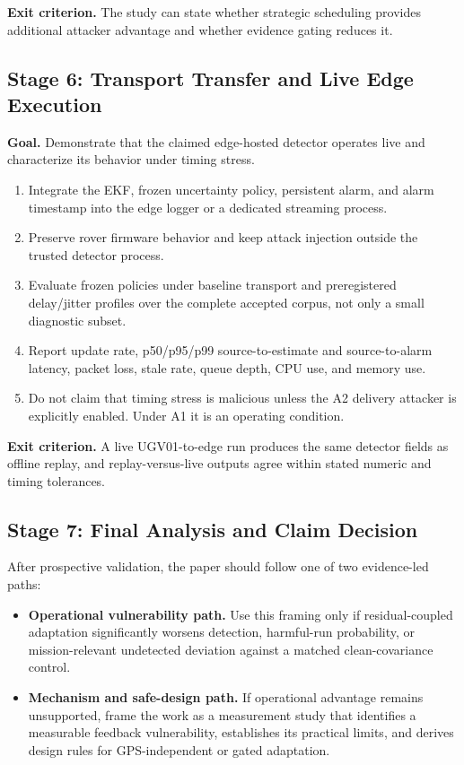 \documentclass[11pt,a4paper]{article}
\begin{document}
\textbf{Exit criterion.} The study can state whether strategic scheduling
provides additional attacker advantage and whether evidence gating reduces it.

\subsection{Stage 6: Transport Transfer and Live Edge Execution}

\textbf{Goal.} Demonstrate that the claimed edge-hosted detector operates live
and characterize its behavior under timing stress.

\begin{enumerate}
    \item Integrate the EKF, frozen uncertainty policy, persistent alarm, and
    alarm timestamp into the edge logger or a dedicated streaming process.

    \item Preserve rover firmware behavior and keep attack injection outside
    the trusted detector process.

    \item Evaluate frozen policies under baseline transport and preregistered
    delay/jitter profiles over the complete accepted corpus, not only a small
    diagnostic subset.

    \item Report update rate, p50/p95/p99 source-to-estimate and
    source-to-alarm latency, packet loss, stale rate, queue depth, CPU use, and
    memory use.

    \item Do not claim that timing stress is malicious unless the A2 delivery
    attacker is explicitly enabled. Under A1 it is an operating condition.
\end{enumerate}

\textbf{Exit criterion.} A live UGV01-to-edge run produces the same detector
fields as offline replay, and replay-versus-live outputs agree within stated
numeric and timing tolerances.

\subsection{Stage 7: Final Analysis and Claim Decision}

After prospective validation, the paper should follow one of two evidence-led
paths:

\begin{itemize}
    \item \textbf{Operational vulnerability path.} Use this framing only if
    residual-coupled adaptation significantly worsens detection, harmful-run
    probability, or mission-relevant undetected deviation against a matched
    clean-covariance control.

    \item \textbf{Mechanism and safe-design path.} If operational advantage
    remains unsupported, frame the work as a measurement study that identifies
    a measurable feedback vulnerability, establishes its practical limits, and
    derives design rules for GPS-independent or gated adaptation.
\end{itemize}
\end{document}

